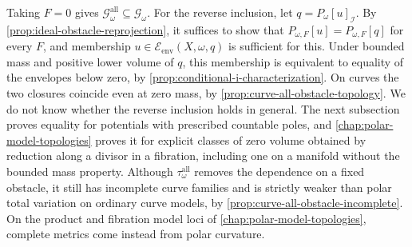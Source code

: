 Taking $F=0$ gives $\mathcal G^{\mathrm{all}}_\omega\subseteq\mathcal G_\omega$. For the reverse inclusion, let $q=P_\omega[u]_{\mathcal I}$. By \cref{prop:ideal-obstacle-reprojection}, it suffices to show that $P_{\omega,F}[u]=P_{\omega,F}[q]$ for every $F$, and membership $u\in\mathcal E_{\mathrm{env}}(X,\omega,q)$ is sufficient for this. Under bounded mass and positive lower volume of $q$, this membership is equivalent to equality of the envelopes below zero, by \cref{prop:conditional-i-characterization}. On curves the two closures coincide even at zero mass, by \cref{prop:curve-all-obstacle-topology}. We do not know whether the reverse inclusion holds in general. The next subsection proves equality for potentials with prescribed countable poles, and \cref{chap:polar-model-topologies} proves it for explicit classes of zero volume obtained by reduction along a divisor in a fibration, including one on a manifold without the bounded mass property. Although $\tau^{\mathrm{all}}_\omega$ removes the dependence on a fixed obstacle, it still has incomplete curve families and is strictly weaker than polar total variation on ordinary curve models, by \cref{prop:curve-all-obstacle-incomplete}. On the product and fibration model loci of \cref{chap:polar-model-topologies}, complete metrics come instead from polar curvature.


